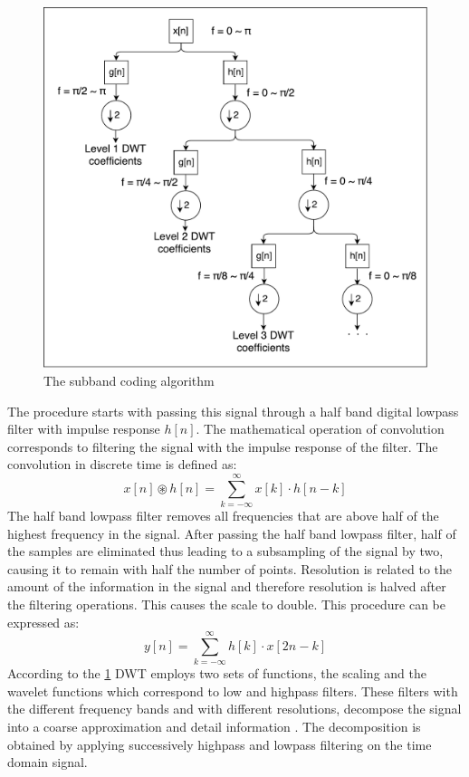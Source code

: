 \begin{figure}[!htb]
\includegraphics[width=15cm,left,keepaspectratio]{figures/subbandcoding}
\caption{The subband coding algorithm}
\label{fig:subbandcoding}
\end{figure}
The procedure starts with passing this signal through a half band digital lowpass filter with impulse response $h[n]$. The mathematical operation of convolution corresponds to filtering the signal with the impulse response of the filter. The convolution in discrete time is defined as:
\begin{equation*}
x[n] \circledast h[n] = \sum_{k=-\infty}^\infty x[k] \cdot h[n-k]
\end{equation*}
The half band lowpass filter removes all frequencies that are above half of the highest frequency in the signal. After passing the half band lowpass filter, half of the samples are eliminated thus leading to a subsampling of the signal by two, causing it to remain with half the number of points. Resolution is related to the amount of the information in the signal and therefore resolution is halved after the filtering operations. This causes the scale to double. This procedure can be expressed as:
\begin{equation*}
y[n] = \sum_{k=-\infty}^\infty h[k] \cdot x[2n-k]
\end{equation*}
According to the \ref{fig:subbandcoding} DWT employs two sets of functions, the scaling and the wavelet functions which correspond to low and highpass filters. These filters with the different frequency bands and with different resolutions, decompose the signal into a coarse approximation and detail information \cite{polikar_wavelet_1996}. The decomposition is obtained by applying successively highpass and lowpass filtering on the time domain signal.\\
